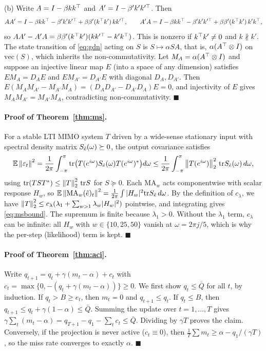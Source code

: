 (b) Write $A=I-\beta kk^{\top}$ and $A'=I-\beta'k'k'^{\top}$. Then
\[
AA'=I-\beta kk^{\top}-\beta'k'k'^{\top}+\beta\beta'(k^{\top}k')\,kk'^{\top},\qquad
A'A=I-\beta kk^{\top}-\beta'k'k'^{\top}+\beta\beta'(k^{\top}k')\,k'k^{\top},
\]
so $AA'-A'A=\beta\beta'(k^{\top}k')(kk'^{\top}-k'k^{\top})$. This is nonzero if $k^{\top}k'\neq0$ and $k\not\parallel k'$.
The state transition of \eqref{eq:gdn} acting on $S$ is $S\mapsto\alpha S A$, that is, $\alpha(A^{\top}\otimes I)$ on $\mathrm{vec}(S)$, which inherits the non-commutativity.
Let $M_A=\alpha(A^{\top}\otimes I)$ and suppose an injective linear map $E$ (into a space of any dimension) satisfies $EM_A=D_AE$ and $EM_{A'}=D_{A'}E$ with diagonal $D_A,D_{A'}$. Then $E(M_AM_{A'}-M_{A'}M_A)=(D_AD_{A'}-D_{A'}D_A)E=0$, and injectivity of $E$ gives $M_AM_{A'}=M_{A'}M_A$, contradicting non-commutativity. \hfill$\blacksquare$

\paragraph{Proof of Theorem~\ref{thm:ms}.}
For a stable LTI MIMO system $T$ driven by a wide-sense stationary input with spectral density matrix $S_{\tilde e}(\omega)\succeq0$, the output covariance satisfies
\[
\mathbb{E}\left\lVert \varepsilon_t \right\rVert^2=\frac1{2\pi}\int_{-\pi}^{\pi}\mathrm{tr}\big(T(e^{i\omega})S_{\tilde e}(\omega)T(e^{i\omega})^*\big)d\omega\le\frac1{2\pi}\int_{-\pi}^{\pi}\left\lVert T(e^{i\omega}) \right\rVert_2^2\,\mathrm{tr}S_{\tilde e}(\omega)\,d\omega,
\]
using $\mathrm{tr}(TST^*)\le\left\lVert T \right\rVert_2^2\,\mathrm{tr}S$ for $S\succeq0$. Each $\mathrm{MA}_w$ acts componentwise with scalar response $H_w$, so $\mathbb{E}\left\lVert \mathrm{MA}_w(\tilde e)_t \right\rVert^2=\frac1{2\pi}\int|H_w|^2\mathrm{tr}S_{\tilde e}\,d\omega$.
By the definition of $c_\lambda$, we have $\left\lVert T \right\rVert_2^2\le c_\lambda(\lambda_1+\sum_{w>1}\lambda_w|H_w|^2)$ pointwise, and integrating gives \eqref{eq:msbound}. The supremum is finite because $\lambda_1>0$.
Without the $\lambda_1$ term, $c_\lambda$ can be infinite: all $H_w$ with $w\in\{10,25,50\}$ vanish at $\omega=2\pi j/5$, which is why the per-step (likelihood) term is kept. \hfill$\blacksquare$

\paragraph{Proof of Theorem~\ref{thm:aci}.}
Write $q_{t+1}=q_t+\gamma(m_t-\alpha)+c_t$ with $c_t=\max\{0,-(q_t+\gamma(m_t-\alpha))\}\ge0$.
We first show $q_t\le\bar Q$ for all $t$, by induction. If $q_t>B\ge e_t$, then $m_t=0$ and $q_{t+1}\le q_t$. If $q_t\le B$, then $q_{t+1}\le q_t+\gamma(1-\alpha)\le\bar Q$.
Summing the update over $t=1,\dots,T$ gives $\gamma\sum_t(m_t-\alpha)=q_{T+1}-q_1-\sum_tc_t\le\bar Q$. Dividing by $\gamma T$ proves the claim.
Conversely, if the projection is never active ($c_t\equiv0$), then $\frac1T\sum m_t\ge\alpha-q_1/(\gamma T)$, so the miss rate converges to exactly $\alpha$. \hfill$\blacksquare$

